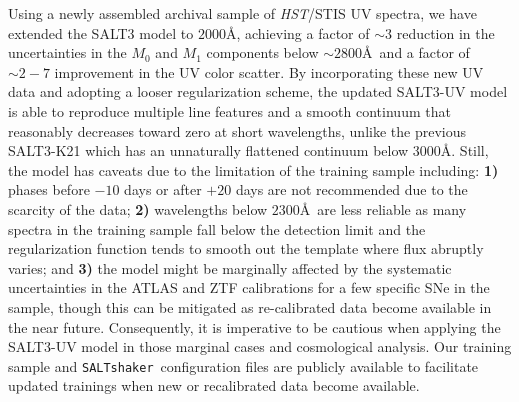 \documentclass[twocolumn,tighten,times,floatfix]{aastex631}
\newcommand{\saltshaker}{\texttt{SALTshaker}}
\begin{document}
Using a newly assembled archival sample of {\it HST}/STIS UV spectra, we have extended the SALT3 model to $2000$\AA, achieving a factor of $\sim3$ reduction in the uncertainties in the $M_0$ and $M_1$ components below $\sim2800$\AA\ and a factor of $\sim 2-7$ improvement in the UV color scatter. 
By incorporating these new UV data and adopting a looser regularization scheme, the updated SALT3-UV model is able to reproduce multiple line features and a smooth continuum that reasonably decreases toward zero at short wavelengths, unlike the previous SALT3-K21 which has an unnaturally flattened continuum below $3000$\AA. Still, the model has caveats due to the limitation of the training sample including: \textbf{1)} phases before $-10$ days or after $+20$ days are not recommended due to the scarcity of the data; \textbf{2)} wavelengths below $2300$\AA\ are less reliable as many spectra in the training sample fall below the detection limit and the regularization function tends to smooth out the template where flux abruptly varies; and \textbf{3)} the model might be marginally affected by the systematic uncertainties in the ATLAS and ZTF calibrations for a few specific SNe in the sample, though this can be mitigated as re-calibrated data become available in the near future. Consequently, it is imperative to be cautious when applying the SALT3-UV model in those marginal cases and cosmological analysis.  Our training sample and \saltshaker\ configuration files are publicly available to facilitate updated trainings when new or recalibrated data become available.
\end{document}
